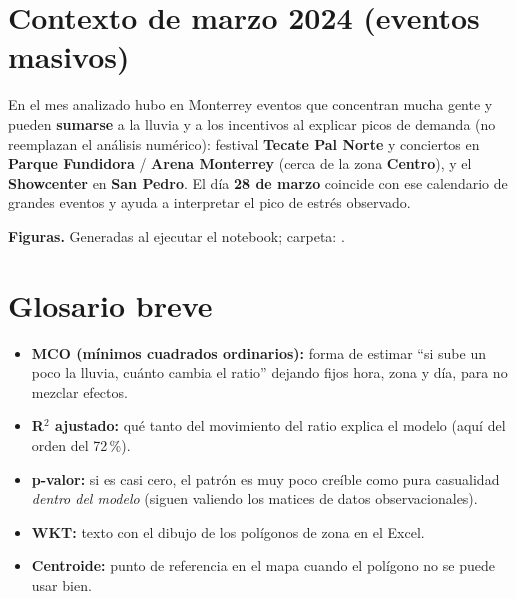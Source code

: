 \documentclass[11pt,a4paper]{article}
\begin{document}
\section*{Contexto de marzo 2024 (eventos masivos)}

\noindent En el mes analizado hubo en Monterrey eventos que concentran mucha gente y pueden \textbf{sumarse} a la lluvia y a los incentivos al explicar picos de demanda (no reemplazan el análisis numérico): festival \textbf{Tecate Pal Norte} y conciertos en \textbf{Parque Fundidora} / \textbf{Arena Monterrey} (cerca de la zona \textbf{Centro}), y el \textbf{Showcenter} en \textbf{San Pedro}. El día \textbf{28 de marzo} coincide con ese calendario de grandes eventos y ayuda a interpretar el pico de estrés observado.

\vspace{0.3em}
{\small\noindent\textbf{Figuras.} Generadas al ejecutar el notebook; carpeta: .}

\section*{Glosario breve}

\begin{itemize}
  \item \textbf{MCO (mínimos cuadrados ordinarios):} forma de estimar ``si sube un poco la lluvia, cuánto cambia el ratio'' dejando fijos hora, zona y día, para no mezclar efectos.
  \item \textbf{R$^2$ ajustado:} qué tanto del movimiento del ratio explica el modelo (aquí del orden del 72\,\%).
  \item \textbf{p-valor:} si es casi cero, el patrón es muy poco creíble como pura casualidad \emph{dentro del modelo} (siguen valiendo los matices de datos observacionales).
  \item \textbf{WKT:} texto con el dibujo de los polígonos de zona en el Excel.
  \item \textbf{Centroide:} punto de referencia en el mapa cuando el polígono no se puede usar bien.
\end{itemize}
\end{document}
